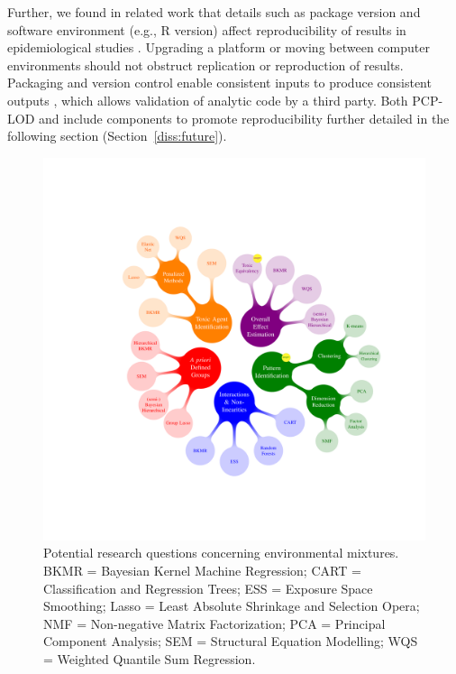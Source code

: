 Further, we found in related work that details such as package version and software environment (e.g., R version) affect reproducibility of results in epidemiological studies \cite{nunez2020reflection}. Upgrading a platform or moving between computer environments should not obstruct replication or reproduction of results. Packaging and version control enable consistent inputs to produce consistent outputs \cite{wilson2014best}, which allows validation of analytic code by a third party. Both PCP-LOD and \bnmf include components to promote reproducibility further detailed in the following section (Section~\ref{diss:future}).

\begin{figure}[!ht]
\centering
\includegraphics[scale = 0.3]{./figures/gibson_dissertation_image.pdf}
\caption[Main questions in mixtures analyses]{Potential research questions concerning environmental mixtures. BKMR = Bayesian Kernel Machine Regression; CART = Classification and Regression Trees; ESS = Exposure Space Smoothing; Lasso = Least Absolute Shrinkage and Selection Opera; NMF = Non-negative Matrix Factorization; PCA = Principal Component Analysis; SEM = Structural Equation Modelling; WQS = Weighted Quantile Sum Regression.}
\label{fig:blobs}
\end{figure}

